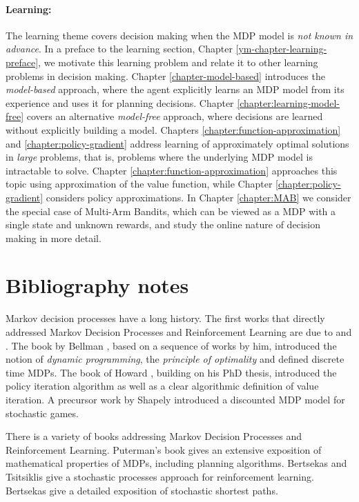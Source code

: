 \paragraph{Learning:} The learning theme covers decision making when the MDP model is \textit{not known in advance}. In a preface to the learning section, Chapter \ref{ym-chapter-learning-preface}, we motivate this learning problem and relate it to other learning problems in decision making.
Chapter \ref{chapter-model-based} introduces the \textit{model-based} approach, where the agent explicitly learns an MDP model from its experience and uses it for planning decisions. Chapter \ref{chapter:learning-model-free} covers an alternative \textit{model-free} approach, where decisions are learned without explicitly building a model. Chapters \ref{chapter:function-approximation} and \ref{chapter:policy-gradient} address learning of approximately optimal solutions in \textit{large} problems, that is, problems where the underlying MDP model is intractable to solve. Chapter \ref{chapter:function-approximation} approaches this topic using approximation of the value function, while Chapter \ref{chapter:policy-gradient} considers policy approximations. In Chapter \ref{chapter:MAB} we consider the special case of Multi-Arm Bandits, which can be viewed as a MDP with a single state and unknown rewards, and study the online nature of decision making in more detail. 

\section{Bibliography notes}

Markov decision processes have a long history. The first works that directly addressed Markov Decision Processes and Reinforcement Learning are due to \cite{Bellman:DynamicProgramming} and \cite{Howard1960}. The book by Bellman \cite{Bellman:DynamicProgramming}, based on a sequence of works by him, introduced the notion of \emph{dynamic programming}, the \emph{principle of optimality} and defined discrete time MDPs. The book of Howard \cite{Howard1960}, building on his PhD thesis, introduced the policy iteration algorithm as well as a clear algorithmic definition of value iteration. A precursor work by Shapely \cite{Shapley53} introduced a discounted MDP model for stochastic games.

There is a variety of books addressing Markov Decision Processes and Reinforcement Learning. Puterman's book \cite{puterman2014markov} gives an extensive exposition of mathematical properties of MDPs, including planning algorithms. Bertsekas and Tsitsiklis \cite{BertsekasTsitsiklis96} give a stochastic processes approach for reinforcement learning. Bertsekas \cite{Bertsekas05} give a detailed exposition of stochastic shortest paths.

